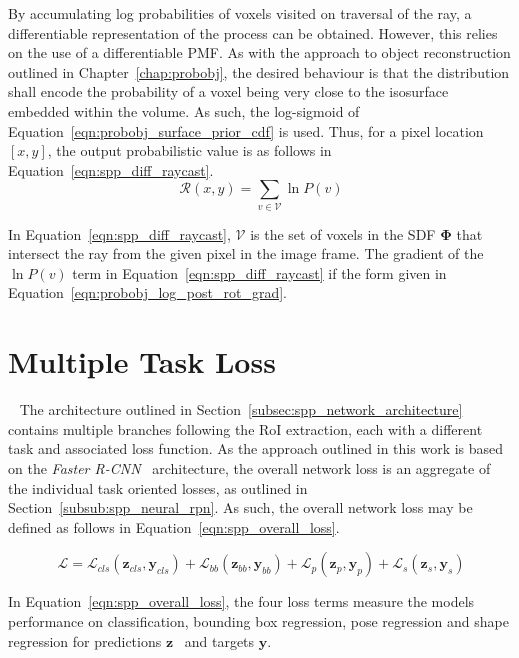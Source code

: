 By accumulating log probabilities of voxels visited on traversal of the ray, a differentiable representation 
of the process can be obtained. However, this relies on the use of a differentiable PMF\@. As with the approach 
to object reconstruction outlined in Chapter~\ref{chap:probobj}, the desired behaviour is that the distribution 
shall encode the probability of a voxel being very close to the isosurface embedded within the volume. As such, 
the log-sigmoid of Equation~\ref{eqn:probobj_surface_prior_cdf} is used. Thus, for a pixel location \( [x, y] \), 
the output probabilistic value is as follows in Equation~\ref{eqn:spp_diff_raycast}.
\begin{equation}
~\label{eqn:spp_diff_raycast}
\mathcal{R}(x, y) = \sum_{v \in \mathcal{V}} \ln P(v)
\end{equation}

In Equation~\ref{eqn:spp_diff_raycast}, \( \mathcal{V} \) is the set of voxels in the SDF \( \bm{\Phi} \) that 
intersect the ray from the given pixel in the image frame. The gradient of the \( \ln P(v) \) term in 
Equation~\ref{eqn:spp_diff_raycast} if the form given in Equation~\ref{eqn:probobj_log_post_rot_grad}.

\section{Multiple Task Loss}
~\label{sec:spp_loss}
The architecture outlined in Section~\ref{subsec:spp_network_architecture} contains multiple branches 
following the RoI extraction, each with a different task and associated loss function. As the approach outlined 
in this work is based on the \textit{Faster R-CNN}~\cite{Ren2015RCNN} architecture, the overall network loss 
is an aggregate of the individual task oriented losses, as outlined in Section~\ref{subsub:spp_neural_rpn}. 
As such, the overall network loss may be defined as follows in Equation~\ref{eqn:spp_overall_loss}.

\begin{equation}
  ~\label{eqn:spp_overall_loss}
  \mathcal{L} = 
  \mathcal{L}_{cls}(\bm{z}_{cls}, \bm{y}_{cls}) + 
  \mathcal{L}_{bb}(\bm{z}_{bb}, \bm{y}_{bb}) + 
  \mathcal{L}_{p}(\bm{z}_{p}, \bm{y}_{p}) + 
  \mathcal{L}_{s}(\bm{z}_{s}, \bm{y}_{s})
\end{equation}

In Equation~\ref{eqn:spp_overall_loss}, the four loss terms measure the models performance on 
classification, bounding box regression, pose regression and shape regression for predictions \( \bm{z} \) \
and targets \( \bm{y} \).

